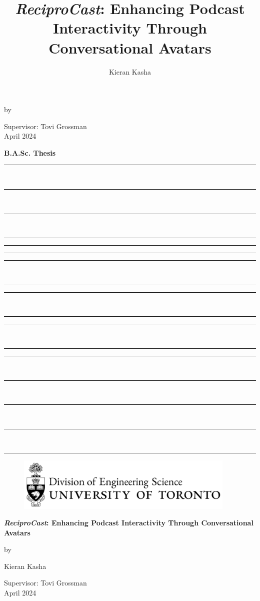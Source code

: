 \documentclass[12pt]{report}
\title{\textit{ReciproCast}: Enhancing Podcast Interactivity Through Conversational Avatars}
\author{Kieran Kasha}
\makeatletter
\newcommand\blankpage{%
    \null
    \thispagestyle{empty}%
    \addtocounter{page}{-1}%
    \newpage}
\newcommand{\supervisor}{Tovi Grossman}
\renewcommand{\maketitle}{%
  \begin{titlepage}
    \onehalfspacing
    \begin{center}
      {\Large\textbf{\@title}\par}
      \vspace{\baselineskip}
      by\par
      {\large{\@author}\par}
      \vspace{\baselineskip}
      {\large Supervisor: \supervisor \\April 2024}
    \end{center}

    \vfill

    \begin{flushright}
    {\Huge\textbf{B.A.Sc. Thesis}}
    \end{flushright}
    
    \vspace{0.1\baselineskip}
    
    \begin{spacing}{0.4}
    \begin{flushright}
    \rule{3.25cm}{0.3pt}\\
    \rule{3.25cm}{0.3pt}\\
    \rule{3.25cm}{0.3pt}\\
    \rule{3.25cm}{0.3pt}
    \end{flushright}
    \vspace{-2\baselineskip}
    \rule{\textwidth}{0.3pt} 
    \rule{3.25cm}{0.3pt} \hspace{\textwidth} \rule{3.25cm}{0.3pt}\\
    \rule{3.25cm}{0.3pt} \hspace{\textwidth} \rule{3.25cm}{0.3pt}\\
    \rule{3.25cm}{0.3pt} \hspace{\textwidth} \rule{3.25cm}{0.3pt}\\
    \rule{3.25cm}{0.3pt} \hspace{\textwidth} \rule{3.25cm}{0.3pt}\\
    \rule{3.25cm}{0.3pt}\\
    \rule{3.25cm}{0.3pt}\\
    \rule{3.25cm}{0.3pt}\\
    \rule{3.25cm}{0.3pt}
    \vspace{2.5\baselineskip}
    \end{spacing}
    \begin{figure}[H]
        \includegraphics[width=10.5cm]{logo.pdf}
    \end{figure}

  \end{titlepage}
}
\makeatother
\begin{document}
    \maketitle
    \afterpage{\blankpage} %
    \clearpage
    
    \vspace*{\fill}
        \begin{center}
          \thispagestyle{empty}
          {\Large\textbf{\textit{ReciproCast}: Enhancing Podcast Interactivity Through Conversational Avatars}\par}
          \vspace{\baselineskip}
          by\par
          {\large{Kieran Kasha}\par}
          \vspace{\baselineskip}
          {\large Supervisor: \supervisor \\April 2024}
        \end{center}
    \vspace*{\fill}
    \clearpage
    
\end{document}
